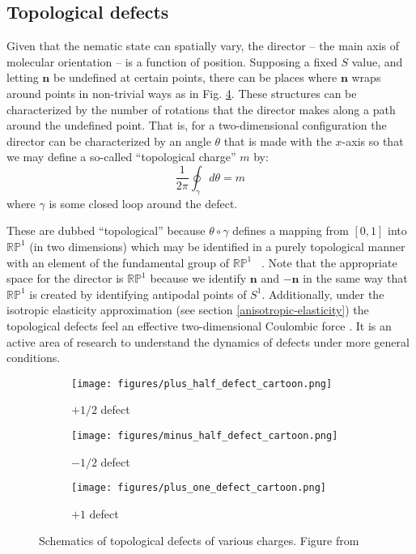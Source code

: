 \documentclass[reqno]{article}
\begin{document}
  \subsection{Topological defects}
  Given that the nematic state can spatially vary, the director
  -- the main axis of molecular orientation -- is a function of position.
  Supposing a fixed $S$ value, and letting $\mathbf{n}$ be undefined at certain
  points, there can be places where $\mathbf{n}$ wraps around points in
  non-trivial ways as in Fig. \ref{fig:defect-cartoons}.
  These structures can be characterized by the number of rotations that the
  director makes along a path around the undefined point.
  That is, for a two-dimensional configuration the director can be characterized
  by an angle $\theta$ that is made with the $x$-axis so that we may define a
  so-called ``topological charge'' $m$ by:
  \begin{equation}
    \frac{1}{2\pi} \oint_\gamma d \theta = m
  \end{equation}
  where $\gamma$ is some closed loop around the defect.

  These are dubbed ``topological'' because $\theta \circ \gamma$ defines a
  mapping from $[0, 1]$ into $\mathbb{RP}^1$ (in two dimensions) which may be identified in a purely
  topological manner with an element of the fundamental group of $\mathbb{RP}^1$
  ~\cite{mermin_topological_1979}.
  Note that the appropriate space for the director is $\mathbb{RP}^1$ because
  we identify $\mathbf{n}$ and $-\mathbf{n}$ in the same way that
  $\mathbb{RP}^1$ is created by identifying antipodal points of $S^1$.
  Additionally, under the isotropic elasticity approximation (see section
  \ref{anisotropic-elasticity}) the topological defects feel an effective
  two-dimensional Coulombic force \cite{selinger_introduction_2016}.
  It is an active area of research to understand the dynamics of defects under
  more general conditions.
  
  \begin{figure}[h]
    \centering
    \begin{subfigure}{0.3\textwidth}
      \texttt{[image: figures/plus\_half\_defect\_cartoon.png]}
      \caption{$+1/2$ defect}
      \label{fig:plus-half-defect-cartoon}
    \end{subfigure}
    \hfill
    \begin{subfigure}{0.3\textwidth}
      \texttt{[image: figures/minus\_half\_defect\_cartoon.png]}
      \caption{$-1/2$ defect}
      \label{fig:minus-half-defect-cartoon}
    \end{subfigure}
    \hfill
    \begin{subfigure}{0.3\textwidth}
      \texttt{[image: figures/plus\_one\_defect\_cartoon.png]}
      \caption{$+1$ defect}
      \label{fig:plus-one-defect-cartoon}
    \end{subfigure}
    \caption{Schematics of topological defects of various charges. Figure from ~\cite{foffano_dynamics_2014}}
    \label{fig:defect-cartoons}
  \end{figure}
\end{document}
